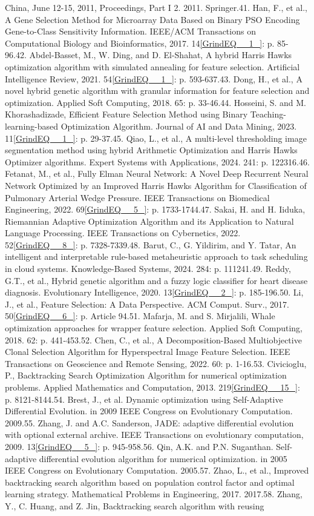 \documentclass{article} %
\begin{document}
China, June 12-15, 2011, Proceedings, Part I 2. 2011. Springer.41. Han, F., et al., A Gene Selection Method for Microarray Data Based on Binary PSO Encoding Gene-to-Class Sensitivity Information. IEEE/ACM Transactions on Computational Biology and Bioinformatics, 2017. 14\eqref{GrindEQ__1_}: p. 85-96.42. Abdel-Basset, M., W. Ding, and D. El-Shahat, A hybrid Harris Hawks optimization algorithm with simulated annealing for feature selection. Artificial Intelligence Review, 2021. 54\eqref{GrindEQ__1_}: p. 593-637.43. Dong, H., et al., A novel hybrid genetic algorithm with granular information for feature selection and optimization. Applied Soft Computing, 2018. 65: p. 33-46.44. Hosseini, S. and M. Khorashadizade, Efficient Feature Selection Method using Binary Teaching-learning-based Optimization Algorithm. Journal of AI and Data Mining, 2023. 11\eqref{GrindEQ__1_}: p. 29-37.45. Qiao, L., et al., A multi-level thresholding image segmentation method using hybrid Arithmetic Optimization and Harris Hawks Optimizer algorithms. Expert Systems with Applications, 2024. 241: p. 122316.46. Fetanat, M., et al., Fully Elman Neural Network: A Novel Deep Recurrent Neural Network Optimized by an Improved Harris Hawks Algorithm for Classification of Pulmonary Arterial Wedge Pressure. IEEE Transactions on Biomedical Engineering, 2022. 69\eqref{GrindEQ__5_}: p. 1733-1744.47. Sakai, H. and H. Iiduka, Riemannian Adaptive Optimization Algorithm and its Application to Natural Language Processing. IEEE Transactions on Cybernetics, 2022. 52\eqref{GrindEQ__8_}: p. 7328-7339.48. Barut, C., G. Yildirim, and Y. Tatar, An intelligent and interpretable rule-based metaheuristic approach to task scheduling in cloud systems. Knowledge-Based Systems, 2024. 284: p. 111241.49. Reddy, G.T., et al., Hybrid genetic algorithm and a fuzzy logic classifier for heart disease diagnosis. Evolutionary Intelligence, 2020. 13\eqref{GrindEQ__2_}: p. 185-196.50. Li, J., et al., Feature Selection: A Data Perspective. ACM Comput. Surv., 2017. 50\eqref{GrindEQ__6_}: p. Article 94.51. Mafarja, M. and S. Mirjalili, Whale optimization approaches for wrapper feature selection. Applied Soft Computing, 2018. 62: p. 441-453.52. Chen, C., et al., A Decomposition-Based Multiobjective Clonal Selection Algorithm for Hyperspectral Image Feature Selection. IEEE Transactions on Geoscience and Remote Sensing, 2022. 60: p. 1-16.53. Civicioglu, P., Backtracking Search Optimization Algorithm for numerical optimization problems. Applied Mathematics and Computation, 2013. 219\eqref{GrindEQ__15_}: p. 8121-8144.54. Brest, J., et al. Dynamic optimization using Self-Adaptive Differential Evolution. in 2009 IEEE Congress on Evolutionary Computation. 2009.55. Zhang, J. and A.C. Sanderson, JADE: adaptive differential evolution with optional external archive. IEEE Transactions on evolutionary computation, 2009. 13\eqref{GrindEQ__5_}: p. 945-958.56. Qin, A.K. and P.N. Suganthan. Self-adaptive differential evolution algorithm for numerical optimization. in 2005 IEEE Congress on Evolutionary Computation. 2005.57. Zhao, L., et al., Improved backtracking search algorithm based on population control factor and optimal learning strategy. Mathematical Problems in Engineering, 2017. 2017.58. Zhang, Y., C. Huang, and Z. Jin, Backtracking search algorithm with reusing 
\end{document}
